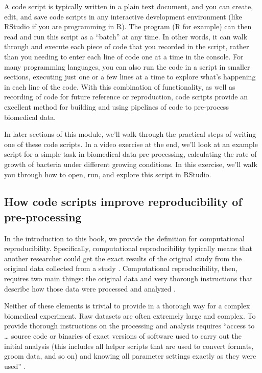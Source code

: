 \documentclass[]{tufte-book}
\begin{document}
A code script is typically written in a plain text document, and you can create,
edit, and save code scripts in any interactive development environment (like
RStudio if you are programming in R). The program (R for example) can then read
and run this script as a ``batch'' at any time. In other words, it can walk
through and execute each piece of code that you recorded in the script, rather
than you needing to enter each line of code one at a time in the console. For
many programming languages, you can also run the code in a script in smaller
sections, executing just one or a few lines at a time to explore what's
happening in each line of the code. With this combination of functionality, as
well as recording of code for future reference or reproduction, code scripts
provide an excellent method for building and using pipelines of code to
pre-process biomedical data.

In later sections of this module, we'll walk through the practical steps of
writing one of these code scripts. In a video exercise at the end, we'll look at
an example script for a simple task in biomedical data pre-processing,
calculating the rate of growth of bacteria under different growing conditions.
In this exercise, we'll walk you through how to open, run, and explore this
script in RStudio.

\subsection{How code scripts improve reproducibility of pre-processing}\label{how-code-scripts-improve-reproducibility-of-pre-processing}

In the introduction to this book, we provide the definition for computational
reproducibility. Specifically, computational reproducibility typically means
that another researcher could get the exact results of the original study from
the original data collected from a study \citep{stark2018before}. Computational
reproducibility, then, requires two main things: the original data and very
thorough instructions that describe how those data were processed and analyzed
\citep{nekrutenko2012next}.

Neither of these elements is trivial to provide in a thorough way for a complex
biomedical experiment. Raw datasets are often extremely large and complex. To
provide thorough instructions on the processing and analysis requires ``access to
\ldots{} source code or binaries of exact versions of software used to carry out the
initial analysis (this includes all helper scripts that are used to convert
formats, groom data, and so on) and knowing all parameter settings exactly as
they were used'' \citep{nekrutenko2012next}.
\end{document}
